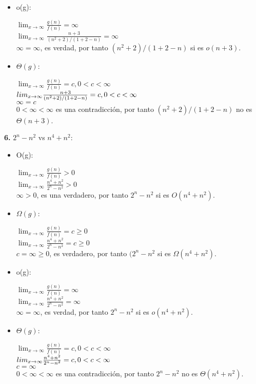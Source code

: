\documentclass{article}
\begin{document}
\begin{enumerate}[label=\textbf{\alph*.}]
\begin{itemize}
      \item o(g):
      
        $\lim_{x\to\infty} \frac{g(n)}{f(n)}=\infty$\\
        $\lim_{x\to\infty} \frac{n+3}{(n^2 +2)/(1+2-n)}=\infty$\\
        $\infty=\infty$, es verdad, por tanto $(n^2 +2)/(1+2-n)$ si es $o(n+3)$.

      \item $\Theta(g)$:
      
        $\lim_{x\to\infty} \frac{g(n)}{f(n)}=c,0<c<\infty$\\
        $\\lim_{x\to\infty} \frac{n+3}{(n^2 +2)/(1+2-n)}=c,0<c<\infty$\\
        $\infty=c$\\
	$0<\infty<\infty$ es una contradicción, por tanto $(n^2 +2)/(1+2-n)$ no es $\Theta(n+3)$.
  \end{itemize}
  
  \textbf{6.} $2^n -n^2$ vs $n^4 +n^2$:    \begin{itemize}
      \item O(g):
      
        $\lim_{x\to\infty} \frac{g(n)}{f(n)}>0$\\
        $\lim_{x\to\infty} \frac{n^4 +n^2}{2^n -n^2}>0$\\
        $\infty>0$, es una verdadero, por tanto $2^n -n^2$ si es $O(n^4 +n^2)$.

      \item $\Omega(g)$:
      
        $\lim_{x\to\infty} \frac{g(n)}{f(n)}=c \geq 0$\\
        $\lim_{x\to\infty} \frac{n^4 +n^2}{2^n -n^2}=c \geq 0$\\
        $c=\infty \geq 0$, es verdadero, por tanto $(2^n -n^2$ si es $\Omega(n^4 +n^2)$.

      \item o(g):
      
        $\lim_{x\to\infty} \frac{g(n)}{f(n)}=\infty$\\
        $\lim_{x\to\infty} \frac{n^4 +n^2}{2^n -n^2}=\infty$\\
        $\infty=\infty$, es verdad, por tanto $2^n -n^2$ si es $o(n^4 +n^2)$.

      \item $\Theta(g)$:
      
        $\lim_{x\to\infty} \frac{g(n)}{f(n)}=c,0<c<\infty$\\
        $\\lim_{x\to\infty} \frac{n^4 +n^2}{2^n -n^2}=c,0<c<\infty$\\
        $c=\infty$\\
	$0<\infty<\infty$ es una contradicción, por tanto $2^n -n^2$ no es $\Theta(n^4 +n^2)$.
    \end{itemize}


\end{enumerate}
\end{document}

